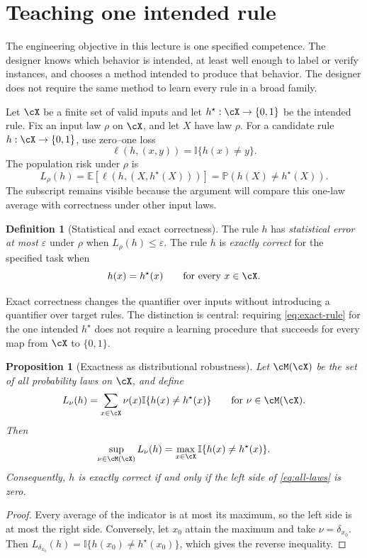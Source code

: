 \documentclass[11pt,twoside]{article}
\newcommand{\E}{\mathbb E}
\newcommand{\I}{\mathbb I}
\renewcommand{\P}{\mathbb P}
\newtheorem{proposition}[theorem]{Proposition}
\theoremstyle{definition}
\newtheorem{definition}[theorem]{Definition}
\theoremstyle{remark}
\begin{document}
\section{Teaching one intended rule}
\label{sec:one-rule}

The engineering objective in this lecture is one specified competence. The
designer knows which behavior is intended, at least well enough to label or
verify instances, and chooses a method intended to produce that behavior. The
designer does not require the same method to learn every rule in a broad
family.

Let \(\cX\) be a finite set of valid inputs and let
\(h^\star:\cX\to\{0,1\}\) be the intended rule. Fix an input law \(\rho\)
on \(\cX\), and let \(X\) have law \(\rho\). For a candidate rule
\(h:\cX\to\{0,1\}\), use zero--one loss
\[
 \ell(h,(x,y))=\I\{h(x)\ne y\}.
\]
The population risk under \(\rho\) is
\begin{equation}
 L_\rho(h)=\E[\ell(h,(X,h^\star(X)))]
 =\P(h(X)\ne h^\star(X)).
 \label{eq:population-error}
\end{equation}
The subscript remains visible because the argument will compare this one-law
average with correctness under other input laws.

\begin{definition}[Statistical and exact correctness]
The rule \(h\) has \emph{statistical error at most \(\varepsilon\)} under
\(\rho\) when \(L_\rho(h)\le\varepsilon\). The rule \(h\) is
\emph{exactly correct} for the specified task when
\begin{equation}
 h(x)=h^\star(x)\qquad\text{for every }x\in\cX.
 \label{eq:exact-rule}
\end{equation}
\end{definition}

Exact correctness changes the quantifier over inputs without introducing a
quantifier over target rules. The distinction is central: requiring
\cref{eq:exact-rule} for the one intended \(h^\star\) does not require a
learning procedure that succeeds for every map from \(\cX\) to
\(\{0,1\}\).

\begin{proposition}[Exactness as distributional robustness]
\label{prop:all-laws}
Let \(\cM(\cX)\) be the set of all probability laws on \(\cX\), and define
\[
 L_\nu(h)=\sum_{x\in\cX}\nu(x)\I\{h(x)\ne h^\star(x)\}
 \qquad\text{for }\nu\in\cM(\cX).
\]
Then
\begin{equation}
 \sup_{\nu\in\cM(\cX)}L_\nu(h)
 =\max_{x\in\cX}\I\{h(x)\ne h^\star(x)\}.
 \label{eq:all-laws}
\end{equation}
Consequently, \(h\) is exactly correct if and only if the left side of
\cref{eq:all-laws} is zero.
\end{proposition}
\begin{proof}
Every average of the indicator is at most its maximum, so the left side is at
most the right side. Conversely, let \(x_0\) attain the maximum and take
\(\nu=\delta_{x_0}\). Then
\(L_{\delta_{x_0}}(h)=\I\{h(x_0)\ne h^\star(x_0)\}\), which gives the reverse
inequality.
\end{proof}
\end{document}
